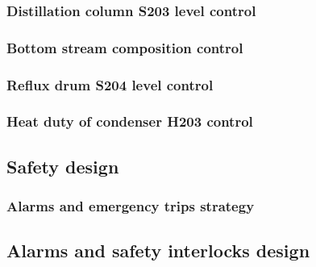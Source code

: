\subsubsection{Distillation column S203 level control}

\subsubsection{Bottom stream composition control}

\subsubsection{Reflux drum S204 level control}

\subsubsection{Heat duty of condenser H203 control}


\subsubsection{}

\subsection{Safety design}

\subsubsection{Alarms and emergency trips strategy}

\subsection{Alarms and safety interlocks design}